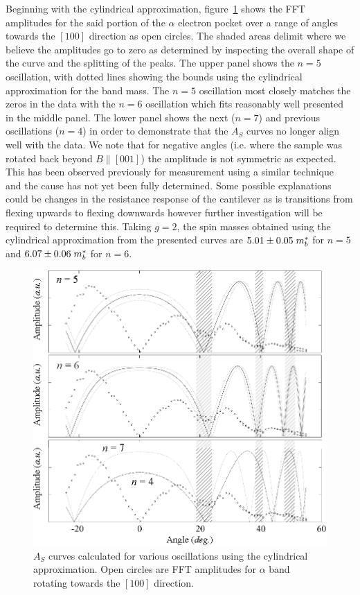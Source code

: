 Beginning with the cylindrical approximation, figure~\ref{Fig:ResD:Band4SpinMassCylindrical} shows the \ac{FFT} amplitudes for the said portion of the $\alpha$ electron pocket over a range of angles towards the $[100]$ direction as open circles. The shaded areas delimit where we believe the amplitudes go to zero as determined by inspecting the overall shape of the curve and the splitting of the peaks. The upper panel shows the $n=5$ oscillation, with dotted lines showing the bounds using the cylindrical approximation for the band mass. The $n=5$ oscillation most closely matches the zeros in the data with the $n=6$ oscillation which fits reasonably well presented in the middle panel. The lower panel shows the next ($n=7$) and previous oscillations ($n=4$) in order to demonstrate that the $A_S$ curves no longer align well with the data. We note that for negative angles (i.e. where the sample was rotated back beyond $B\parallel[001]$) the amplitude is not symmetric as expected. This has been observed previously for measurement using a similar technique~\cite{Rourke2010b} and the cause has not yet been fully determined. Some possible explanations could be changes in the resistance response of the cantilever as is transitions from flexing upwards to flexing downwards however further investigation will be required to determine this. Taking $g=2$, the spin masses obtained using the cylindrical approximation from the presented curves are $5.01\pm0.05\; m^*_b$ for $n=5$ and $6.07\pm0.06\; m^*_b$ for $n=6$.
\begin{figure}[htbp]
    \begin{center}
        \includegraphics[scale=0.75]{Chapter-dHvABaFe2P2/Figures/Mass/SpinMassBand4Cylindrical/SpinMassBand4Cylindrical}
        \caption{$A_S$ curves calculated for various oscillations using the cylindrical approximation. Open circles are \ac{FFT} amplitudes for $\alpha$ band rotating towards the $[100]$ direction.}
        \label{Fig:ResD:Band4SpinMassCylindrical}
    \end{center}
\end{figure}
